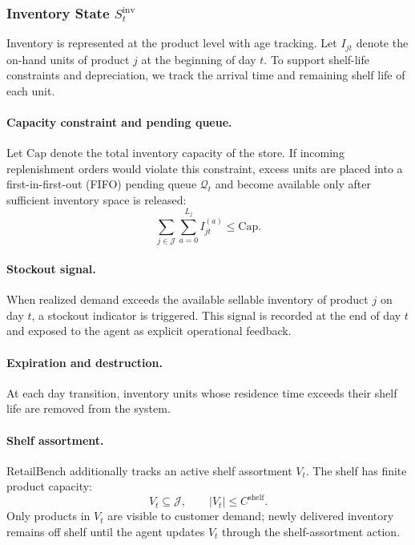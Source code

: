 \subsubsection{Inventory State \texorpdfstring{$S_t^{\text{inv}}$}{S t inv}}

Inventory is represented at the product level with age tracking. Let $I_{jt}$ denote the on-hand units of product $j$ at the beginning of day $t$. To support shelf-life constraints and depreciation, we track the arrival time and remaining shelf life of each unit.

\paragraph{Capacity constraint and pending queue.}
Let $\mathrm{Cap}$ denote the total inventory capacity of the store. If incoming replenishment orders would violate this constraint, excess units are placed into a first-in-first-out (FIFO) pending queue $\mathcal{Q}_t$ and become available only after sufficient inventory space is released:
\begin{equation}
\sum_{j\in\mathcal{J}} \sum_{a=0}^{L_j} I_{jt}^{(a)} \le \mathrm{Cap}.
\end{equation}

\paragraph{Stockout signal.}
When realized demand exceeds the available sellable inventory of product $j$ on day $t$, a stockout indicator is triggered. This signal is recorded at the end of day $t$ and exposed to the agent as explicit operational feedback.

\paragraph{Expiration and destruction.}
At each day transition, inventory units whose residence time exceeds their shelf life are removed from the system.

\paragraph{Shelf assortment.}
RetailBench additionally tracks an active shelf assortment $V_t$. The shelf has finite product capacity:
\begin{equation}
V_t \subseteq \mathcal{J}, \qquad |V_t| \le C^{\mathrm{shelf}}.
\end{equation}
Only products in $V_t$ are visible to customer demand; newly delivered inventory remains off shelf until the agent updates $V_t$ through the shelf-assortment action.

